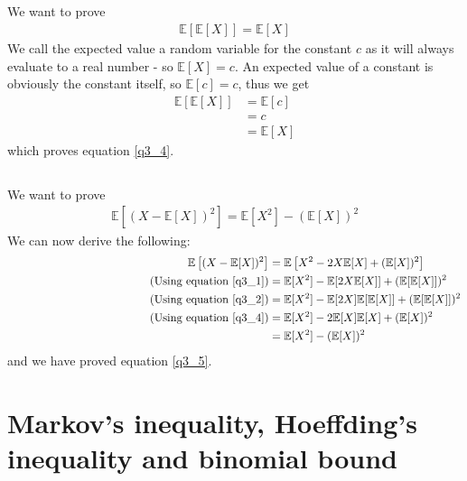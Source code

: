 \documentclass[a4paper]{article}
\newcommand{\comment}[1]{%
  \text{\phantom{(#1)}} \tag{#1}}
\begin{document}
\subsection{}

We want to prove
\begin{align}
\mathbb{E}[\mathbb{E}[X]]=\mathbb{E}[X]
\label{q3_4}
\end{align}
We call the expected value a random variable for the constant $c$ as it will always evaluate to a real number - so $\mathbb{E}[X]=c$. An expected value of a constant is obviously the constant itself, so $\mathbb{E}[c]=c$, thus we get
\begin{align*}
\mathbb{E}[\mathbb{E}[X]]&=\mathbb{E}[c] \\
&= c \\
&= \mathbb{E}[X]
\end{align*}
which proves equation \ref{q3_4}.

\subsection{}
We want to prove
\begin{align}
  \mathbb{E}\left[(X-\mathbb{E}[X])^2\right]=\mathbb{E}[X^2]-(\mathbb{E}[X])^2
  \label{q3_5}
\end{align}
We can now derive the following:
\begin{align*}
  \mathbb{E}\left[(X-\mathbb{E}[X])^2\right]&=\mathbb{E}\left[X^2-2X\mathbb{E}[X]+(\mathbb{E}[X])^2\right] \\
  \comment{Using equation \ref{q3_1}} &= \mathbb{E}[X^2]-\mathbb{E}[2X\mathbb{E}[X]]+(\mathbb{E}[\mathbb{E}[X]])^2 \\
  \comment{Using equation \ref{q3_2}} &= \mathbb{E}[X^2]-\mathbb{E}[2X]\mathbb{E}[\mathbb{E}[X]]+(\mathbb{E}[\mathbb{E}[X]])^2 \\
  \comment{Using equation \ref{q3_4}} &= \mathbb{E}[X^2]-2\mathbb{E}[X]\mathbb{E}[X]+(\mathbb{E}[X])^2 \\
  &= \mathbb{E}[X^2]-(\mathbb{E}[X])^2
\end{align*}
and we have proved equation \ref{q3_5}.

\section{Markov's inequality, Hoeffding's inequality and binomial bound}
\end{document}
